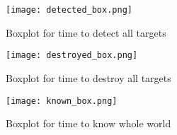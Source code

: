 \begin{figure}[H]
	\centering
	\texttt{[image: detected\_box.png]}
	\caption{Boxplot for time to detect all targets}
	\label{fig:detectBoxPlot}
\end{figure}

\begin{figure}[H]
	\centering
	\texttt{[image: destroyed\_box.png]}
	\caption{Boxplot for time to destroy all targets}
	\label{fig:destroyedBoxPlot}
\end{figure}

\begin{figure}[H]
	\centering
	\texttt{[image: known\_box.png]}
	\caption{Boxplot for time to know whole world}
	\label{fig:knownBoxPlot}
\end{figure}

